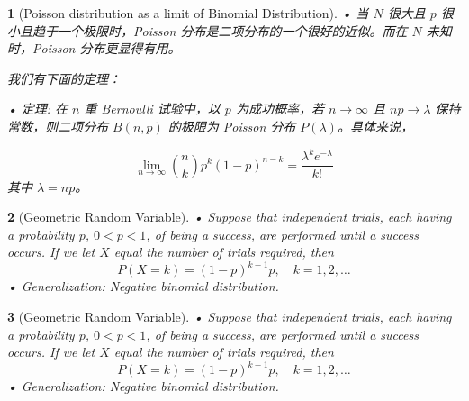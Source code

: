 \documentclass[UTF8]{report}
\theoremstyle{MyLineTheoremStyle} %
\theoremstyle{MyBlockTheoremStyle} %
\theoremstyle{MySubsubsectionStyle} %
\newtheorem{definition}{}
\begin{document}
\begin{definition}[Poisson distribution as a limit of Binomial Distribution]
    • 当 \(N\) 很大且 \(p\) 很小且趋于一个极限时，Poisson 分布是二项分布的一个很好的近似。而在 \(N\) 未知时，Poisson 分布更显得有用。\par
    我们有下面的定理：\par
    • 定理: 在 \(n\) 重 Bernoulli 试验中，以 \(p\) 为成功概率，若 \(n \to \infty\) 且 \(np \to \lambda\) 保持常数，则二项分布 \(B(n, p)\) 的极限为 Poisson 分布 \(P(\lambda)\)。具体来说，\par
    \[
    \lim_{n \to \infty} \binom{n}{k} p^k (1 - p)^{n - k} = \frac{\lambda^k e^{-\lambda}}{k!}
    \]
    其中 \(\lambda = np\)。
\end{definition}

\begin{definition}[Geometric Random Variable]
    • Suppose that independent trials, each having a probability \(p\), \(0 < p < 1\), of being a success, are performed until a success 
    occurs. If we let \(X\) equal the number of trials required, then
    \[
    P(X = k) = (1 - p)^{k-1} p, \quad k = 1, 2, \ldots
    \]
    • Generalization: Negative binomial distribution.
\end{definition}

\begin{definition}[Geometric Random Variable]
    • Suppose that independent trials, each having a probability \(p\), \(0 < p < 1\), of being a success, are performed until a success 
    occurs. If we let \(X\) equal the number of trials required, then
    \[
    P(X = k) = (1 - p)^{k-1} p, \quad k = 1, 2, \ldots
    \]
    • Generalization: Negative binomial distribution.
\end{definition}
\end{document}
